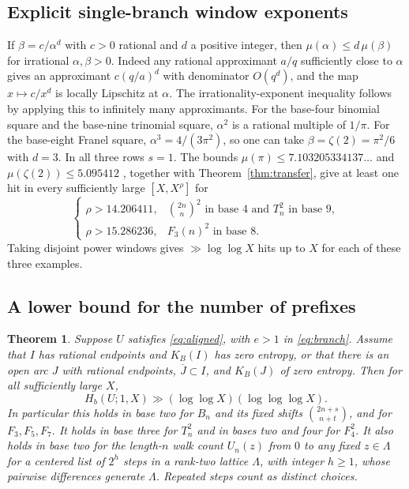 \documentclass[11pt,reqno,a4paper]{amsart}
\newtheorem{theorem}{Theorem}[section]
\theoremstyle{remark}
\begin{document}
\subsection{Explicit single-branch window exponents}

If \(\beta=c/\alpha^d\) with \(c>0\) rational and \(d\) a
positive integer, then
\(\mu(\alpha)\le d\,\mu(\beta)\) for irrational \(\alpha,\beta>0\).
Indeed any rational approximant \(a/q\) sufficiently close to
\(\alpha\) gives an approximant \(c(q/a)^d\) with denominator
\(O(q^d)\), and the map \(x\mapsto c/x^d\) is locally Lipschitz
at \(\alpha\). The irrationality-exponent inequality follows by
applying this to infinitely many approximants. For the base-four
binomial square and the base-nine trinomial square,
\(\alpha^2\) is a rational multiple of \(1/\pi\). For the
base-eight Franel square, \(\alpha^3=4/(3\pi^2)\), so one can
take \(\beta=\zeta(2)=\pi^2/6\) with \(d=3\). In all three rows
\(s=1\). The bounds \(\mu(\pi)\le7.103205334137\ldots\)
\cite{app-zeilberger-zudilin} and
\(\mu(\zeta(2))\le5.095412\) \cite{app-zudilin}, together with
Theorem~\ref{thm:transfer}, give at least one hit in every
sufficiently large \([X,X^\rho]\) for
\begin{equation}\label{eq:app-single-branch-exponents}
 \begin{cases}
  \rho>14.206411,& \binom{2n}{n}^2\text{ in base }4
                   \text{ and }T_n^2\text{ in base }9,\\
  \rho>15.286236,& F_3(n)^2\text{ in base }8 .
 \end{cases}
\end{equation}
Taking disjoint power windows gives \(\gg\log\log X\) hits up to
\(X\) for each of these three examples.

\subsection{A lower bound for the number of prefixes}\label{sec:app-counting}

\begin{theorem}\label{thm:app-counting}
Suppose \(U\) satisfies \eqref{eq:aligned}, with \(e>1\) in
\eqref{eq:branch}. Assume that \(I\) has rational endpoints and
\(K_B(I)\) has zero entropy, or that there is an open arc \(J\) with
rational endpoints, \(\overline J\subset I\), and \(K_B(J)\) of zero
entropy. Then for all sufficiently large \(X\),
\begin{equation}\label{eq:app-counting}
 H_b(U;1,X)\gg(\log\log X)(\log\log\log X).
\end{equation}
In particular this holds in base two for \(B_n\) and its fixed shifts
\(\binom{2n+s}{n+t}\), and for \(F_3,F_5,F_7\). It holds in base
three for \(T_n^2\) and in bases two and four for \(F_4^2\).
It also holds in base two for the length-\(n\) walk count \(U_n(z)\)
from \(0\) to any fixed \(z\in\Lambda\) for a centered list of
\(2^h\) steps in a rank-two lattice \(\Lambda\), with integer \(h\ge1\),
whose pairwise differences generate \(\Lambda\). Repeated steps
count as distinct choices.
\end{theorem}
\end{document}
